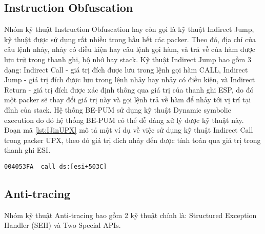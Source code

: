 \subsection{Instruction Obfuscation}
\hspace{0.5cm}Nhóm kỹ thuật Instruction Obfuscation hay còn gọi là kỹ thuật Indirect Jump, kỹ thuật được sử dụng rất nhiều trong hầu hết các packer. Theo đó, địa chỉ của câu lệnh nhảy, nhảy có điều kiện hay câu lệnh gọi hàm, và trả về của hàm được lưu trữ trong thanh ghi, bộ nhớ hay stack. Kỹ thuật Indirect Jump bao gồm 3 dạng: Indirect Call - giá trị đích được lưu trong lệnh gọi hàm CALL, Indirect Jump - giá trị đích được lưu trong lệnh nhảy hay nhảy có điều kiện, và Indirect Return - giá trị đích được xác định thông qua giá trị của thanh ghi ESP, do đó một packer sẽ thay đổi giá trị này và gọi lệnh trả về hàm để nhảy tới vị trí tại đỉnh của stack. Hệ thống BE-PUM sử dụng kỹ thuật Dynamic symbolic execution do đó hệ thống BE-PUM có thể dễ dàng xử lý được kỹ thuật này. Đoạn mã \ref {lst:IJinUPX} mô tả một ví dụ về việc sử dụng kỹ thuật Indirect Call trong packer UPX, theo đó giá trị đích nhảy đến được tính toán qua giá trị trong thanh ghi ESI.
\begin{code}
\begin{lstlisting}[captionpos=b,caption={Kỹ thuật Indirect Jump sử dụng trong packer UPX},label={lst:IJinUPX},frame=single]
004053FA  call ds:[esi+503C]
\end{lstlisting}
\end{code}

\subsection{Anti-tracing}
\hspace{0.5cm}Nhóm kỹ thuật Anti-tracing bao gồm 2 kỹ thuật chính là: Structured Exception Handler (SEH) và Two Special APIs.

